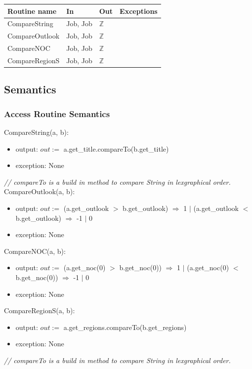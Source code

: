 \documentclass[12pt]{article}
\begin{document}
\begin{tabular}{| l | l | l | p{6cm} |}
\hline
\textbf{Routine name} & \textbf{In} & \textbf{Out} & \textbf{Exceptions}\\
\hline
CompareString & Job, Job & $\mathbb{Z}$ & \\
\hline
CompareOutlook & Job, Job & $\mathbb{Z}$ & \\
\hline
CompareNOC & Job, Job & $\mathbb{Z}$ & \\
\hline
CompareRegionS & Job, Job & $\mathbb{Z}$ & \\
\hline
\end{tabular}

\subsection* {Semantics}

\subsubsection* {Access Routine Semantics}

\noindent CompareString(a, b):
\begin{itemize}
\item output: $out := $ a.get\_title.compareTo(b.get\_title)
\item exception: None
\end{itemize}
\noindent \textit{// compareTo is a build in method to compare String in lexgraphical order.}\\

\noindent CompareOutlook(a, b):
\begin{itemize}
\item output: $out :=$ (a.get\_outlook $>$ b.get\_outlook) $\Rightarrow$ 1 $|$ (a.get\_outlook $<$ b.get\_outlook) $\Rightarrow$ -1 $|$ 0
\item exception: None
\end{itemize}

\noindent CompareNOC(a, b):
\begin{itemize}
\item output: $out :=$ (a.get\_noc(0) $>$ b.get\_noc(0)) $\Rightarrow$ 1 $|$ (a.get\_noc(0) $<$ b.get\_noc(0)) $\Rightarrow$ -1 $|$ 0
\item exception: None
\end{itemize}

\noindent CompareRegionS(a, b):
\begin{itemize}
\item output: $out := $ a.get\_regions.compareTo(b.get\_regions)
\item exception: None
\end{itemize}
\noindent \textit{// compareTo is a build in method to compare String in lexgraphical order.}\\
\end{document}
